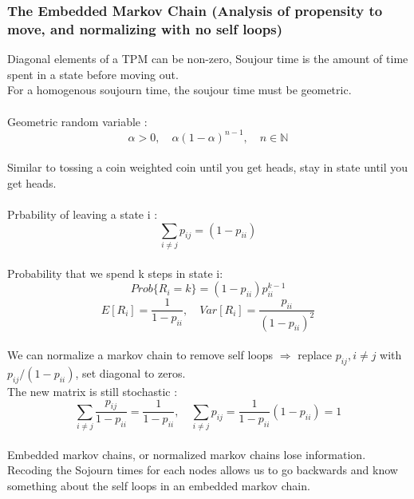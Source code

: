 \documentclass{article}
\begin{document}
	\subsubsection{The Embedded Markov Chain (Analysis of propensity to move, and normalizing with no self loops)}
	Diagonal elements of a TPM can be non-zero, Soujour time is the amount of time spent in a state before moving out. 
	\\For a homogenous soujourn time, the soujour time must be geometric.
	\\
	\\Geometric random variable : 
	\[ \alpha > 0,\quad \alpha(1-\alpha) ^ { n -1 }, \quad n \in \mathbb{N} \]
	\\Similar to tossing a coin weighted coin until you get heads, stay in state until you get heads.
	\\
	\\Prbability of leaving a state i :
	\[ \sum\limits_{i\neq j}{ p_{ij}} = (1 - p_{ii}) \]
	\\Probability that we spend k steps in state i:
	\[ Prob\{R_i=k\} = (1 - p_{ii})p_{ii}^{k-1}\]
	\[ E[R_i] = \frac{1}{1-p_{ii}}, \quad Var[R_i] =\frac{p_{ii}}{(1-p_{ii})^2} \]
	\\We can normalize a markov chain to remove self loops $\Longrightarrow$ replace $p_{ij}, i \neq j$ with $p_{ij} / (1 - p_{ii} )$, set diagonal to zeros.
	\\The new matrix is still stochastic :
	\[\sum\limits_{i\neq j}{\frac{p_{ij}}{1 - p_{ii}}} = \frac{1}{1-p_{ii}}, \quad\sum\limits_{i\neq j}{p_{ij}} =\frac{1}{1-p_{ii}} ( 1-p_{ii} )= 1\]
	\\Embedded markov chains, or normalized markov chains lose information.  Recoding the Sojourn times for each nodes allows us to go backwards and know
	something about the self loops in an embedded markov chain. 
\end{document}
